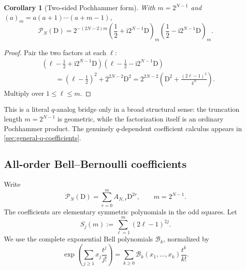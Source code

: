 \documentclass[11pt]{article}
\numberwithin{equation}{section}
\newtheorem{corollary}[theorem]{Corollary}
\theoremstyle{definition}
\theoremstyle{remark}
\newcommand{\ii}{\mathrm i}
\newcommand{\D}{\mathrm D}
\newcommand{\Bell}{\mathcal B}
\begin{document}
\begin{corollary}[Two-sided Pochhammer form]
\label{cor:pochhammer-operator}
With $m=2^{N-1}$ and $(a)_m=a(a+1)\cdots(a+m-1)$,
\begin{equation}
 \boxed{
 \mathcal P_N(\D)=
 2^{-(2N-2)m}
 \left(\frac12+\ii2^{N-1}\D\right)_m
 \left(\frac12-\ii2^{N-1}\D\right)_m.}
 \label{eq:pochhammer-operator}
\end{equation}
\end{corollary}
\begin{proof}
Pair the two factors at each $\ell$:
\begin{align*}
 &\left(\ell-\frac12+\ii2^{N-1}\D\right)
  \left(\ell-\frac12-\ii2^{N-1}\D\right)\\
 &\qquad=\left(\ell-\frac12\right)^2+2^{2N-2}\D^2
 =2^{2N-2}\left(\D^2+\frac{(2\ell-1)^2}{4^N}\right).
\end{align*}
Multiply over $1\le\ell\le m$.
\end{proof}

This is a literal $q$-analog bridge only in a broad structural sense: the
truncation length $m=2^{N-1}$ is geometric, while the factorization itself is
an ordinary Pochhammer product.  The genuinely $q$-dependent coefficient
calculus appears in \cref{sec:general-q-coefficients}.

\subsection{All-order Bell--Bernoulli coefficients}

Write
\begin{equation}
 \mathcal P_N(\D)=\sum_{r=0}^{m}A_{N,r}\D^{2r},
 \qquad m=2^{N-1}.
 \label{eq:operator-coeff-expansion}
\end{equation}
The coefficients are elementary symmetric polynomials in the odd squares.
Let
\begin{equation}
 S_j(m):=\sum_{\ell=1}^{m}(2\ell-1)^{2j}.
 \label{eq:odd-power-sums}
\end{equation}
We use the complete exponential Bell polynomials $\Bell_k$, normalized by
\begin{equation}
 \exp\left(\sum_{j\ge1}x_j\frac{t^j}{j!}\right)
 =\sum_{k\ge0}\Bell_k(x_1,\ldots,x_k)\frac{t^k}{k!}.
 \label{eq:Bell-normalization}
\end{equation}
\end{document}
